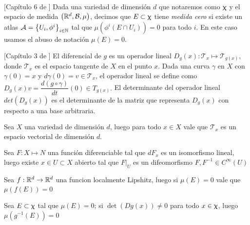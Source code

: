 \begin{definition}{[Cap\'itulo 6 de \cite{lee:00}]}
	Dada una variedad de dimensi\'on $d$ que notaremos como $\upchi$ y el espacio de medida $\left({\mathbb{R}}^d, \mathcal{B}, \mu\right)$, decimos que $E \subset \upchi$ tiene \textit{medida cero} si existe un atlas $\mathcal{A} = \left\lbrace U_i, \phi^i\right\rbrace_{i \in {\mathbb{N}}}$ tal que $\mu \left(\phi^i \left(E \cap U_i \right) \right) = 0$ para todo $i$. En este caso usamos el abuso de notaci\'on $\mu(E) = 0$.
\end{definition}

\begin{definition}{[Cap\'itulo 3 de \cite{lee:00}]}
	El diferencial de $g$ es un operador lineal $D_g(x): \mathcal{T}_x \mapsto \mathcal{T}_{g (x)}$, donde $\mathcal{T}_x$ es el espacio tangente de $X$ en el punto $x$. Dada una curva $\gamma$
	en $X$ con $\gamma(0) = x$ y $d\gamma(0) = v \in \mathcal{T}_x$, el operador lineal se define como $D_g(x)v = \dfrac{d (g\circ \gamma)}{dt}(0) \in T_{g (x)}.$ El determinante del operador lineal $det (D_g (x))$ es el determinante de la matriz que representa $D_g (x)$ con respecto a una base arbitraria.
\end{definition}

\begin{proposition}
	Sea $X$ una variedad de dimensi\'on $d$, luego para todo $x \in X$ vale que $\mathcal{T}_x$ es un espacio vectorial de dimensi\'on $d$.
\end{proposition}

\begin{theorem}
	\label{theorem: Teorema de la funcion inversa}
	Sea $F: X \mapsto N$ una funci\'on diferenciable tal que $dF_x$ es un isomorfismo lineal, luego existe $x \in U \subset X$ abierto tal que $F \vert_U$ es un difeomorfismo  \eg $F, F^{-1} \in C^{\infty}(U)$
\end{theorem}

\begin{proposition}
	\label{prop: Localmente Lipshitz preserva medida}
	Sea $f : {\mathbb{R}}^d \rightarrow {\mathbb{R}}^d$ una funcion localmente Lipshitz, luego si $\mu(E) = 0$ vale que $\mu(f(E)) = 0$
\end{proposition}

\begin{lemma}
	\label{Difeomorfismos locales preservan medida cero}
	Sea $E \subset \upchi$ tal que $\mu(E) = 0$; si $\det \left(Dg(x)\right) \neq 0$ para todo $x \in \upchi$, luego $\mu\left(g^{-1}(E)\right) = 0$
\end{lemma}

